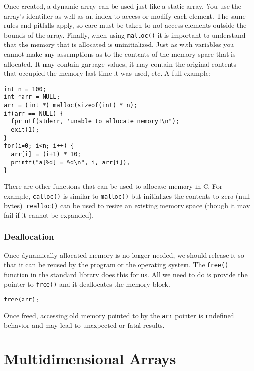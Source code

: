 Once created, a dynamic array can be used just like a static
array.  You use the array's identifier as well as an index to
access or modify each element.  The same rules and pitfalls
apply, so care must be taken to not access elements outside
the bounds of the array.  Finally, when using \texttt{malloc()}
it is important to understand that the memory that is allocated
is uninitialized.  Just as with variables you cannot make any
assumptions as to the contents of the memory space that is
allocated.  It may contain garbage values, it may contain the
original contents that occupied the memory last time it was used, 
etc.  A full example:

\begin{verbatim}
int n = 100;
int *arr = NULL;
arr = (int *) malloc(sizeof(int) * n);
if(arr == NULL) {
  fprintf(stderr, "unable to allocate memory!\n");
  exit(1);
}
for(i=0; i<n; i++) {
  arr[i] = (i+1) * 10;
  printf("a[%d] = %d\n", i, arr[i]);
}
\end{verbatim}

There are other functions that can be used to allocate memory
in C.  For example, \texttt{calloc()} is similar to 
\texttt{malloc()} but initializes the contents
to zero (null bytes).  \texttt{realloc()} can be used to resize
an existing memory space (though it may fail if it cannot be 
expanded).  

\subsubsection{Deallocation}

Once dynamically allocated memory is no longer needed, we 
should release it so that it can be reused by the program or the
operating system.  The \texttt{free()} function in the
standard library does this for us.  All we need to do is provide
the pointer to \texttt{free()} and it deallocates the
memory block.

\begin{verbatim}
free(arr);
\end{verbatim}

Once freed, accessing old memory pointed to by the \texttt{arr}
pointer is undefined behavior and may lead to unexpected or fatal
results.  

\section{Multidimensional Arrays}

